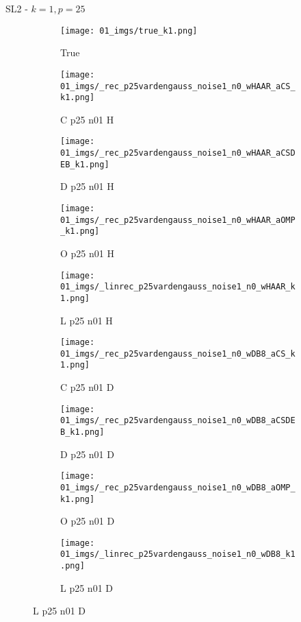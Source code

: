 \begin{frame}{SL2 - $k=1,p=25$}{}
\begin{figure}
\begin{subfigure}{0.1\textwidth}
\texttt{[image: 01\_imgs/true\_k1.png]}
\caption*{\Tiny True}
\end{subfigure}
\begin{subfigure}{0.1\textwidth}
\texttt{[image: 01\_imgs/\_rec\_p25vardengauss\_noise1\_n0\_wHAAR\_aCS\_k1.png]}
\caption*{\Tiny C p25 n01 H}
\end{subfigure}
\begin{subfigure}{0.1\textwidth}
\texttt{[image: 01\_imgs/\_rec\_p25vardengauss\_noise1\_n0\_wHAAR\_aCSDEB\_k1.png]}
\caption*{\Tiny D p25 n01 H}
\end{subfigure}
\begin{subfigure}{0.1\textwidth}
\texttt{[image: 01\_imgs/\_rec\_p25vardengauss\_noise1\_n0\_wHAAR\_aOMP\_k1.png]}
\caption*{\Tiny O p25 n01 H}
\end{subfigure}
\begin{subfigure}{0.1\textwidth}
\texttt{[image: 01\_imgs/\_linrec\_p25vardengauss\_noise1\_n0\_wHAAR\_k1.png]}
\caption*{\Tiny L p25 n01 H}
\end{subfigure}
\begin{subfigure}{0.1\textwidth}
\texttt{[image: 01\_imgs/\_rec\_p25vardengauss\_noise1\_n0\_wDB8\_aCS\_k1.png]}
\caption*{\Tiny C p25 n01 D}
\end{subfigure}
\begin{subfigure}{0.1\textwidth}
\texttt{[image: 01\_imgs/\_rec\_p25vardengauss\_noise1\_n0\_wDB8\_aCSDEB\_k1.png]}
\caption*{\Tiny D p25 n01 D}
\end{subfigure}
\begin{subfigure}{0.1\textwidth}
\texttt{[image: 01\_imgs/\_rec\_p25vardengauss\_noise1\_n0\_wDB8\_aOMP\_k1.png]}
\caption*{\Tiny O p25 n01 D}
\end{subfigure}
\begin{subfigure}{0.1\textwidth}
\texttt{[image: 01\_imgs/\_linrec\_p25vardengauss\_noise1\_n0\_wDB8\_k1.png]}
\caption*{\Tiny L p25 n01 D}
\end{subfigure}


\vspace{5pt}


\end{figure}
\end{frame}
